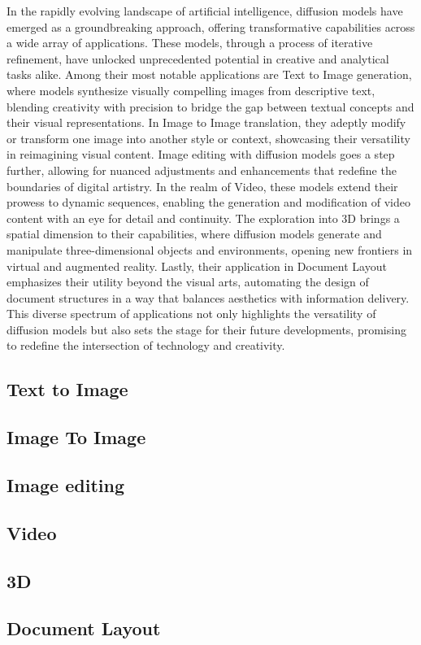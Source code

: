 In the rapidly evolving landscape of artificial intelligence, diffusion models have emerged as a groundbreaking approach, offering transformative capabilities across a wide array of applications. These models, through a process of iterative refinement, have unlocked unprecedented potential in creative and analytical tasks alike. Among their most notable applications are Text to Image generation, where models synthesize visually compelling images from descriptive text, blending creativity with precision to bridge the gap between textual concepts and their visual representations. In Image to Image translation, they adeptly modify or transform one image into another style or context, showcasing their versatility in reimagining visual content. Image editing with diffusion models goes a step further, allowing for nuanced adjustments and enhancements that redefine the boundaries of digital artistry. In the realm of Video, these models extend their prowess to dynamic sequences, enabling the generation and modification of video content with an eye for detail and continuity. The exploration into 3D brings a spatial dimension to their capabilities, where diffusion models generate and manipulate three-dimensional objects and environments, opening new frontiers in virtual and augmented reality. Lastly, their application in Document Layout emphasizes their utility beyond the visual arts, automating the design of document structures in a way that balances aesthetics with information delivery. This diverse spectrum of applications not only highlights the versatility of diffusion models but also sets the stage for their future developments, promising to redefine the intersection of technology and creativity.

\subsection{Text to Image}


\subsection{Image To Image}


\subsection{Image editing}


\subsection{Video}


\subsection{3D}


\subsection{Document Layout}

